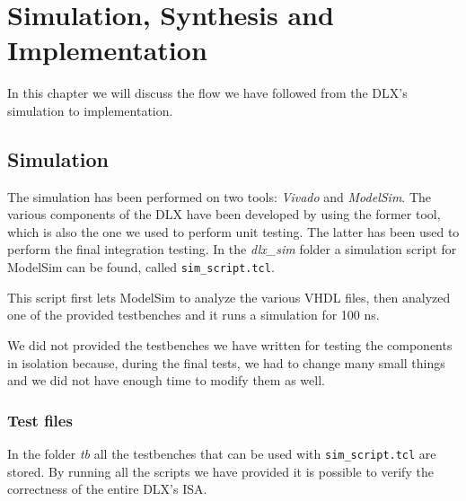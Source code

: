 \chapter{Simulation, Synthesis and Implementation}
\label{chap:syn_impl}

In this chapter we will discuss the flow we have followed from the DLX's simulation to implementation.

\section{Simulation}

The simulation has been performed on two tools: {\it Vivado} and {\it ModelSim}. The various components of the DLX have been developed
by using the former tool, which is also the one we used to perform unit testing. The latter has been used to perform the final integration
testing. In the {\it dlx\_sim} folder a simulation script for ModelSim can be found, called \verb|sim_script.tcl|.

This script first lets ModelSim to analyze the various VHDL files, then analyzed one of the provided testbenches and it runs a simulation
for 100 ns.

We did not provided the testbenches we have written for testing the components in isolation because, during the final tests, we had to change
many small things and we did not have enough time to modify them as well.

\subsection{Test files}

In the folder {\it tb} all the testbenches that can be used with \verb|sim_script.tcl| are stored. By running all the scripts we have provided
it is possible to verify the correctness of the entire DLX's ISA.


